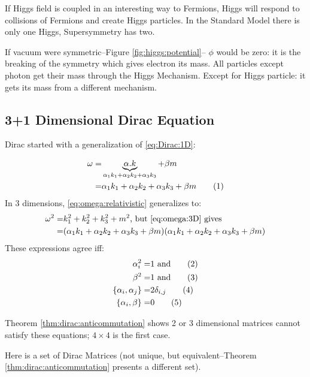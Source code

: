 \documentclass[]{article}
\newcommand\numberthis{\addtocounter{equation}{1}\tag{\theequation}}
\begin{document}
If Higgs field is coupled in an interesting way to Fermions, Higgs will respond to collisions of Fermions and create Higgs particles. In the Standard Model there is only one Higgs, Supersymmetry has two.

If vacuum were symmetric--Figure \ref{fig:higgs:potential}-- $\phi$ would be zero: it is the breaking of the symmetry which gives electron its mass. All particles except photon get their mass through the Higgs Mechanism. Except for Higgs particle: it gets its mass from a different mechanism.

\subsection{3+1 Dimensional Dirac Equation}

Dirac started with a generalization of \eqref{eq:Dirac:1D}:

\begin{align*}
	\omega =& \underbrace{\alpha . k}_{\alpha_1 k_1 + \alpha_2 k_2 + \alpha_3 k_3} +\beta m\\
	=& \alpha_1 k_1 + \alpha_2 k_2 + \alpha_3 k_3 +\beta m \numberthis \label{eq:omega:3D}\\
\end{align*}
In 3 dimensions, \eqref{eq:omega:relativistic} generalizes to:
\begin{align*}
	\omega^2 =& k_1^2 + k_2^2 +k_3^2 +m^2 \text{, but \eqref{eq:omega:3D} gives}\\
	=& (\alpha_1 k_1 + \alpha_2 k_2 + \alpha_3 k_3 +\beta m)(\alpha_1 k_1 + \alpha_2 k_2 + \alpha_3 k_3 +\beta m)
\end{align*}
These expressions agree iff:
\begin{align*}
	\alpha_i^2 =& 1  \text{ and} \numberthis \label{eq:dirac:ac1}\\
	\beta^2 =& 1 \text{ and} \numberthis \label{eq:dirac:ac2}\\
	\{\alpha_i,\alpha_j\} =& 2 \delta_{i,j} \numberthis \label{eq:dirac:ac3}\\
	\{\alpha_i,\beta\} =& 0 \numberthis \label{eq:dirac:ac4}
\end{align*}

Theorem \ref{thm:dirac:anticommutation} shows 2 or 3 dimensional matrices cannot satisfy these equations; $4 \times 4$ is the first case.

Here is a set of Dirac Matrices (not unique, but equivalent--Theorem \ref{thm:dirac:anticommutation} presents a different set).
\end{document}
